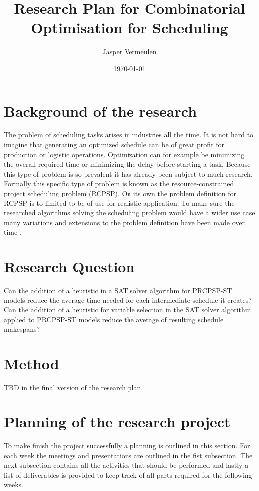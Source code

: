 \documentclass[english]{article}
\title{Research Plan for Combinatorial Optimisation for Scheduling}
\author{Jasper Vermeulen}
\date{\today}
\begin{document}
\maketitle


\section*{Background of the research}
The problem of scheduling tasks arises in industries all the time. It is not hard to imagine that generating an optimized schedule can be of great profit for production or logistic operations.
Optimization can for example be minimizing the overall required time or minimizing the delay before starting a task. Because this type of problem is so prevalent it has already been subject to much research.\\
Formally this specific type of problem is known as the resource-constrained project scheduling problem (RCPSP). On its own the problem definition for RCPSP is to limited to be of use for realistic application. To make sure the researched algorithms solving the scheduling problem would have a wider use case many variations and extensions to the problem definition have been made over time \cite{RN6}.


\section*{Research Question}
Can the addition of a heuristic in a SAT solver algorithm for PRCPSP-ST models reduce the average time needed for each intermediate schedule it creates?
Can the addition of a heuristic for variable selection in the SAT solver algorithm applied to PRCPSP-ST models reduce the average of resulting schedule makespans?

\section*{Method}
TBD in the final version of the research plan.

\section*{Planning of the research project}
To make finish the project successfully a planning is outlined in this section. For each week the meetings and presentations are outlined in the fist subsection. The next subsection contains all the activities that should be performed and lastly a list of deliverables is provided to keep track of all parts required for the following weeks.
\end{document}
